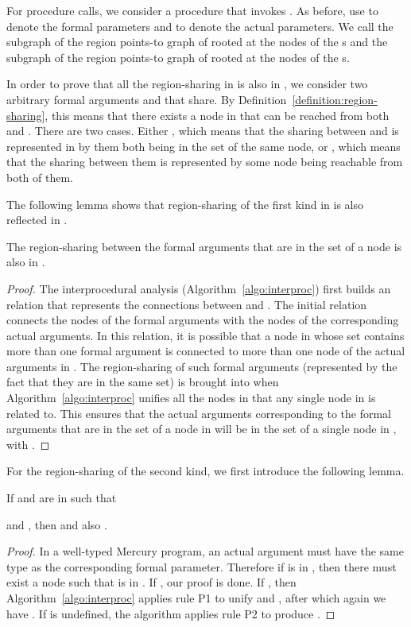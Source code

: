\documentclass{tlp}
\begin{document}
For procedure calls, we consider a procedure  that invokes .
As before, use  to denote the formal parameters
and  to denote the actual parameters.
We call
 the subgraph
of the region points-to graph of  rooted at the nodes of the s and
 the subgraph
of the region points-to graph of  rooted at the nodes of the s.

In order to prove that
all the region-sharing in  is also in ,
we consider two arbitrary formal arguments  and  that share.
By Definition~\ref{definition:region-sharing},
this means that there exists a node in 
that can be reached from both  and .
There are two cases.
Either , which means that
the sharing between  and  is represented in 
by them both being in the  set of the same node,
or ,
which means that the sharing between them
is represented by some node being reachable from both of them.

The following lemma shows that
region-sharing of the first kind in 
is also reflected in .
\begin{lemma}
\label{lemma:sharing_same_node}
The region-sharing between the formal arguments that are in the
 set of a node  is also in .
\end{lemma}
\begin{proof}
The interprocedural analysis (Algorithm~\ref{algo:interproc})
first builds an  relation
that represents the connections between  and .
The initial  relation connects
the nodes of the formal arguments with
the nodes of the corresponding actual arguments.
In this  relation, it is possible that a node in 
whose  set contains more than one formal argument
is connected to more than one node of the actual arguments in .
The region-sharing of such formal arguments
(represented by the fact that they are in the same  set)
is brought into  when Algorithm~\ref{algo:interproc}
unifies all the nodes in 
that any single node in  is related to.
This ensures that the actual arguments corresponding to the formal arguments
that are in the  set of a node  in 
will be in the  set of a single node  in ,
with .
\end{proof}

For the region-sharing of the second kind,
we first introduce the following lemma.
\begin{lemma}
\label{lemma:sharing_diff_nodes}
If  and  are in  such that

and ,
then 
and also .
\end{lemma}
\begin{proof}
In a well-typed Mercury program,
an actual argument must have the same type
as the corresponding formal parameter.
Therefore if  is in ,
then there must exist a node  such that
 is in .
If , our proof is done.
If ,
then Algorithm~\ref{algo:interproc}
applies rule P1 to unify  and ,
after which again we have .
If  is undefined,
the algorithm applies rule P2 to produce .
\end{proof}
\end{document}
